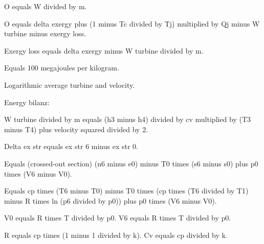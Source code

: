 O equals W divided by m.  

O equals delta exergy plus (1 minus Tc divided by Tj) multiplied by Qj minus W turbine minus exergy loss.  

Exergy loss equals delta exergy minus W turbine divided by m.  

Equals 100 megajoules per kilogram.  

Logarithmic average turbine and velocity.  

Energy bilanz:  

W turbine divided by m equals (h3 minus h4) divided by cv multiplied by (T3 minus T4) plus velocity squared divided by 2.

Delta ex str equals ex str 6 minus ex str 0.

Equals (crossed-out section) (n6 minus e0) minus T0 times (s6 minus s0) plus p0 times (V6 minus V0).

Equals cp times (T6 minus T0) minus T0 times (cp times (T6 divided by T1) minus R times ln (p6 divided by p0)) plus p0 times (V6 minus V0).

V0 equals R times T divided by p0.  
V6 equals R times T divided by p0.  

R equals cp times (1 minus 1 divided by k).  
Cv equals cp divided by k.